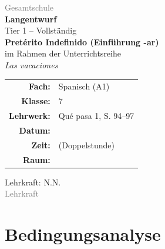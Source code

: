 \documentclass[11pt,a4paper]{article}
\newcommand{\fach}{Spanisch}
\newcommand{\jahrgangsstufe}{7}
\newcommand{\schulart}{Gesamtschule}
\newcommand{\stundenthema}{Pretérito Indefinido (Einführung -ar)}
\newcommand{\reihenthema}{Las vacaciones}
\newcommand{\unterrichtsdatum}{\underline{\hspace{3cm}}}
\newcommand{\unterrichtszeit}{\underline{\hspace{3cm}}}
\newcommand{\raum}{\underline{\hspace{2cm}}}
\newcommand{\lehrkraft}{N.N.}
\newcommand{\ausbildungsstand}{Lehrkraft}
\newcommand{\gerniveau}{A1}
\newcommand{\lehrwerk}{Qué pasa 1}
\newcommand{\lehrwerkseite}{S. 94--97}
\begin{document}
\begin{titlepage}
    \centering
    \vspace*{2cm}

    {\large\textcolor{gray}{\schulart}}\\[2cm]

    {\Huge\textcolor{fach}{\textbf{Langentwurf}}}\\[0.5cm]
    {\large Tier 1 -- Vollständig}\\[2cm]

    {\LARGE\textbf{\stundenthema}}\\[0.5cm]
    {\large im Rahmen der Unterrichtsreihe}\\[0.3cm]
    {\Large\textit{\reihenthema}}\\[2cm]

    \begin{tabular}{rl}
        \textbf{Fach:} & \fach{} (\gerniveau) \\[0.3cm]
        \textbf{Klasse:} & \jahrgangsstufe \\[0.3cm]
        \textbf{Lehrwerk:} & \lehrwerk, \lehrwerkseite \\[0.3cm]
        \textbf{Datum:} & \unterrichtsdatum \\[0.3cm]
        \textbf{Zeit:} & \unterrichtszeit{} (Doppelstunde) \\[0.3cm]
        \textbf{Raum:} & \raum \\[0.3cm]
    \end{tabular}

    \vfill

    {\large Lehrkraft: \lehrkraft}\\[0.3cm]
    {\normalsize\textcolor{gray}{\ausbildungsstand}}\\[1cm]

\end{titlepage}

\tableofcontents
\newpage

\section{Bedingungsanalyse}
\end{document}
